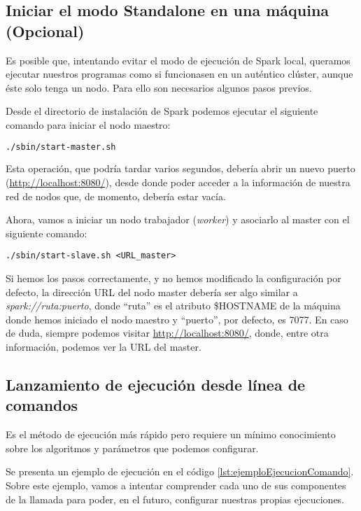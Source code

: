 \subsection{Iniciar el modo Standalone en una máquina (Opcional)}\label{subsec:startStandalone}

Es posible que, intentando evitar el modo de ejecución de Spark local, queramos ejecutar nuestros programas como si funcionasen en un auténtico clúster, aunque éste solo tenga un nodo. Para ello son necesarios algunos pasos previos.


Desde el directorio de instalación de Spark podemos ejecutar el siguiente comando para iniciar el nodo maestro:

\begin{lstlisting}[language=bash,label=lst:ejemploEjecucionComando]
./sbin/start-master.sh
\end{lstlisting}

Esta operación, que podría tardar varios segundos, debería abrir un nuevo puerto (\url{http://localhost:8080/}), desde donde poder acceder a la información de nuestra red de nodos que, de momento, debería estar vacía.

Ahora, vamos a iniciar un nodo trabajador (\textit{worker}) y asociarlo al master con el siguiente comando:

\begin{lstlisting}
./sbin/start-slave.sh <URL_master>
\end{lstlisting}

Si hemos los pasos correctamente, y no hemos modificado la configuración por defecto, la dirección URL del nodo master debería ser algo similar a \textit{spark://ruta:puerto}, donde ``ruta'' es el atributo \$HOSTNAME de la máquina donde hemos iniciado el nodo maestro y ``puerto'', por defecto, es 7077. En caso de duda, siempre podemos visitar \url{http://localhost:8080/}, donde, entre otra información, podemos ver la URL del master.


\subsection{Lanzamiento de ejecución desde línea de comandos}

Es el método de ejecución más rápido pero requiere un mínimo conocimiento sobre los algoritmos y parámetros que podemos configurar.

Se presenta un ejemplo de ejecución en el código \ref{lst:ejemploEjecucionComando}. Sobre este ejemplo, vamos a intentar comprender cada uno de sus componentes de la llamada para poder, en el futuro, configurar nuestras propias ejecuciones. 

